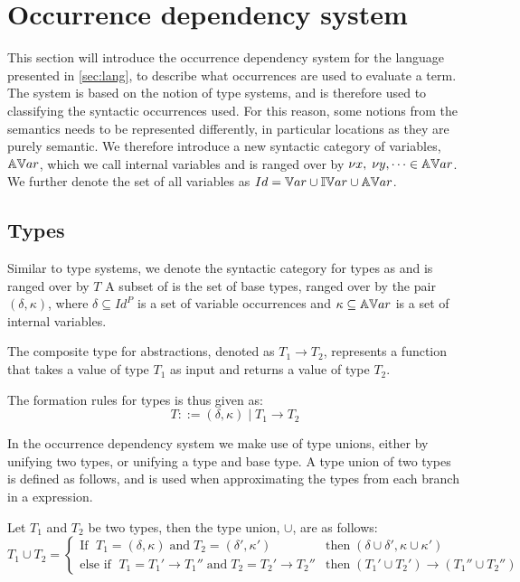 \documentclass[../../master.tex]{subfiles}
\begin{document}
\section{Occurrence dependency system}
This section will introduce the occurrence dependency system for the language presented in \cref{sec:lang}, to describe what occurrences are used to evaluate a term.
The system is based on the notion of type systems, and is therefore used to classifying the syntactic occurrences used.
For this reason, some notions from the semantics needs to be represented differently, in particular locations as they are purely semantic.
We therefore introduce a new syntactic category of variables, $\mathbb{AV}ar$, which we call internal variables and is ranged over by $\nu x,\;\nu y,\cdots\in\mathbb{AV}ar$.
We further denote the set of all variables as $Id=\mathbb{V}ar\cup\mathbb{IV}ar\cup\mathbb{AV}ar$.

\subsection{Types}
Similar to type systems, we denote the syntactic category for types as  and is ranged over by $T$
A subset of  is the set of base types, ranged over by the pair $(\delta,\kappa)$, where $\delta\subseteq Id^P$ is a set of variable occurrences and $\kappa\subseteq\mathbb{AV}ar$ is a set of internal variables.

The composite type for abstractions, denoted as $T_1\rightarrow T_2$, represents a function that takes a value of type $T_1$ as input and returns a value of type $T_2$.

The formation rules for types is thus given as:
$$T::=(\delta,\kappa)\mid T_1 \rightarrow T_2$$

In the occurrence dependency system we make use of type unions, either by unifying two types, or unifying a type and base type.
A type union of two types is defined as follows, and is used when approximating the types from each branch in a  expression.
\begin{definition}
	Let $T_1$ and $T_2$ be two types, then the type union, $\cup$, are as follows:
	\begin{equation*}
		T_1\cup T_2=
		\left\{\begin{matrix}
			\mbox{If } \; T_1=(\delta,\kappa) \;\mbox{and}\; T_2=(\delta',\kappa')  & \mbox{then} \; (\delta\cup\delta',\kappa\cup\kappa')\\
			\mbox{else if } \; T_1=T_1'\rightarrow T_1''\;\mbox{and}\;T_2=T_2'\rightarrow T_2'' & \mbox{then} \; (T_1'\cup T_2')\rightarrow (T_1''\cup T_2'')
		\end{matrix}\right.
	\end{equation*}
\end{definition}
\end{document}
